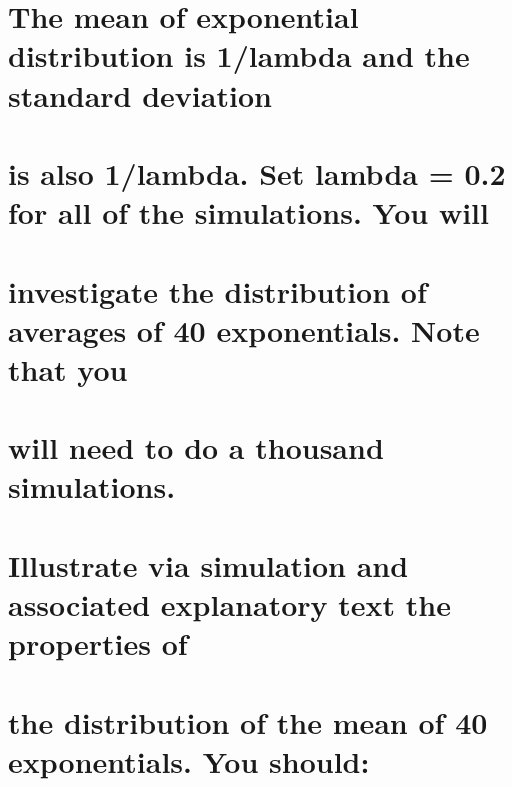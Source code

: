 \documentclass[
]{article}
\begin{document}
\hypertarget{the-mean-of-exponential-distribution-is-1lambda-and-the-standard-deviation}{%
\section{The mean of exponential distribution is 1/lambda and the
standard
deviation}\label{the-mean-of-exponential-distribution-is-1lambda-and-the-standard-deviation}}

\hypertarget{is-also-1lambda.-set-lambda-0.2-for-all-of-the-simulations.-you-will}{%
\section{is also 1/lambda. Set lambda = 0.2 for all of the simulations.
You
will}\label{is-also-1lambda.-set-lambda-0.2-for-all-of-the-simulations.-you-will}}

\hypertarget{investigate-the-distribution-of-averages-of-40-exponentials.-note-that-you}{%
\section{investigate the distribution of averages of 40 exponentials.
Note that
you}\label{investigate-the-distribution-of-averages-of-40-exponentials.-note-that-you}}

\hypertarget{will-need-to-do-a-thousand-simulations.}{%
\section{will need to do a thousand
simulations.}\label{will-need-to-do-a-thousand-simulations.}}

\hypertarget{illustrate-via-simulation-and-associated-explanatory-text-the-properties-of}{%
\section{Illustrate via simulation and associated explanatory text the
properties
of}\label{illustrate-via-simulation-and-associated-explanatory-text-the-properties-of}}

\hypertarget{the-distribution-of-the-mean-of-40-exponentials.-you-should}{%
\section{the distribution of the mean of 40 exponentials. You
should:}\label{the-distribution-of-the-mean-of-40-exponentials.-you-should}}
\end{document}
